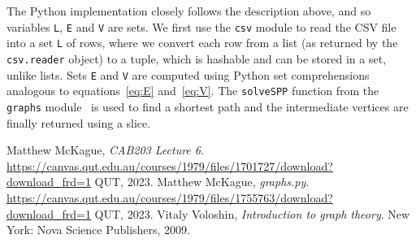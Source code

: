 \documentclass[a4paper]{article}
\begin{document}
The Python implementation closely follows the description above, and so variables \verb+L+, \verb+E+ and \verb+V+ are sets.  We first use the \verb+csv+ module to read the CSV file into a set \verb+L+ of rows, where we convert each row from a list (as returned by the \verb+csv.reader+ object) to a tuple, which is hashable and can be stored in a set, unlike lists.  Sets \verb+E+ and \verb+V+ are computed using Python set comprehensions analogous to equations~\eqref{eq:E} and~\eqref{eq:V}.  The \verb+solveSPP+ function from the \verb+graphs+ module~\cite{cab203graphs.py} is used to find a shortest path and the intermediate vertices are finally returned using a slice.


\begin{thebibliography}{9}
        Matthew McKague,
        \emph{CAB203 Lecture 6}.
        \url{https://canvas.qut.edu.au/courses/1979/files/1701727/download?download_frd=1}
        QUT, 2023.
        Matthew McKague,
        \emph{graphs.py}.
        \url{https://canvas.qut.edu.au/courses/1979/files/1755763/download?download_frd=1}
        QUT, 2023.
        Vitaly Voloshin,
        \emph{Introduction to graph theory}.
        New York: Nova Science Publishers, 2009.
\end{thebibliography}
\end{document}
